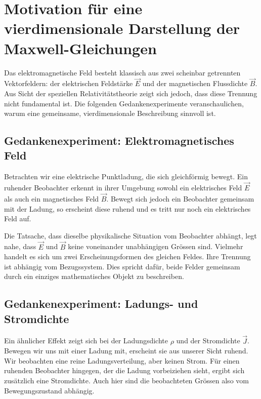 \section{Motivation für eine vierdimensionale Darstellung der Maxwell-Gleichungen}
\label{maxwell:motivation}

Das elektromagnetische Feld besteht klassisch aus zwei scheinbar getrennten Vektorfeldern: der elektrischen Feldstärke \( \vec{E} \) und der magnetischen Flussdichte \( \vec{B} \). Aus Sicht der speziellen Relativitätstheorie zeigt sich jedoch, dass diese Trennung nicht fundamental ist. Die folgenden Gedankenexperimente veranschaulichen, warum eine gemeinsame, vierdimensionale Beschreibung sinnvoll ist.

\subsection{Gedankenexperiment: Elektromagnetisches Feld}

Betrachten wir eine elektrische Punktladung, die sich gleichförmig bewegt.
Ein ruhender Beobachter erkennt in ihrer Umgebung sowohl ein elektrisches Feld \( \vec{E} \) als auch ein magnetisches Feld \( \vec{B} \).
%
Bewegt sich jedoch ein Beobachter gemeinsam mit der Ladung, so erscheint diese ruhend und es tritt nur noch ein elektrisches Feld auf. 

Die Tatsache, dass dieselbe physikalische Situation vom Beobachter abhängt, legt nahe, dass \( \vec{E} \) und \( \vec{B} \) keine voneinander unabhängigen Grössen sind.
Vielmehr handelt es sich um zwei Erscheinungsformen des gleichen Feldes.
Ihre Trennung ist abhängig vom Bezugssystem.
Dies spricht dafür, beide Felder gemeinsam durch ein einziges mathematisches Objekt zu beschreiben.

\subsection{Gedankenexperiment: Ladungs- und Stromdichte}

Ein ähnlicher Effekt zeigt sich bei der Ladungsdichte \( \rho \) und der Stromdichte \( \vec{J} \).
%
%
Bewegen wir uns mit einer Ladung mit, erscheint sie aus unserer Sicht ruhend.
Wir beobachten eine reine Ladungsverteilung, aber keinen Strom.
Für einen ruhenden Beobachter hingegen, der die Ladung vorbeiziehen sieht, ergibt sich zusätzlich eine Stromdichte.
Auch hier sind die beobachteten Grössen also vom Bewegungszustand abhängig.


